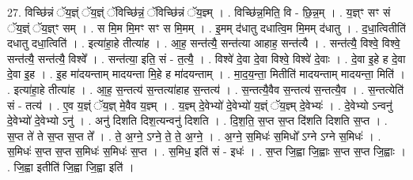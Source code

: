 \documentclass[17pt]{extarticle}
\begin{document}
27. विच्छि॑न्नं ॅय॒ज्ञ्ं ॅय॒ज्ञ्ं ॅविच्छि॑न्नं॒ ॅविच्छि॑न्नं ॅय॒ज्ञ्म् । . विच्छि॑न्न॒मिति॒ वि - छि॒न्न॒म् । . य॒ज्ञ्ꣳ सꣳ सं ॅय॒ज्ञ्ं ॅय॒ज्ञ्ꣳ सम् । . स मि॒म मि॒मꣳ सꣳ स मि॒मम् । . इ॒मम् द॑धातु दधात्वि॒म मि॒मम् द॑धातु । . द॒धा॒त्वितीति॑ दधातु दधा॒त्विति॑ । . इत्या॑हा॒हे तीत्या॑ह । . आ॒ह॒ सन्त॑त्यै॒ सन्त॑त्या आहाह॒ सन्त॑त्यै । . सन्त॑त्यै॒ विश्वे॒ विश्वे॒ सन्त॑त्यै॒ सन्त॑त्यै॒ विश्वे᳚ । . सन्त॑त्या॒ इति॒ सं - त॒त्यै॒ । . विश्वे॑ दे॒वा दे॒वा विश्वे॒ विश्वे॑ दे॒वाः । . दे॒वा इ॒हे ह दे॒वा दे॒वा इ॒ह । . इ॒ह मा॑दयन्ताम् मादयन्ता मि॒हे ह मा॑दयन्ताम् । . मा॒द॒य॒न्ता॒ मितीति॑ मादयन्ताम् मादयन्ता॒ मिति॑ । . इत्या॑हा॒हे तीत्या॑ह । . आ॒ह॒ स॒न्तत्य॑ स॒न्तत्या॑हाह स॒न्तत्य॑ । . स॒न्तत्यै॒वैव स॒न्तत्य॑ स॒न्तत्यै॒व । . स॒न्तत्येति॑ सं - तत्य॑ । . ए॒व य॒ज्ञ्ं ॅय॒ज्ञ् मे॒वैव य॒ज्ञ्म् । . य॒ज्ञ्म् दे॒वेभ्यो॑ दे॒वेभ्यो॑ य॒ज्ञ्ं ॅय॒ज्ञ्म् दे॒वेभ्यः॑ । . दे॒वेभ्यो ऽन्वनु॑ दे॒वेभ्यो॑ दे॒वेभ्यो ऽनु॑ । . अनु॑ दिशति दिश॒त्यन्वनु॑ दिशति । . दि॒श॒ति॒ स॒प्त स॒प्त दि॑शति दिशति स॒प्त । . स॒प्त ते॑ ते स॒प्त स॒प्त ते᳚ । . ते॒ अ॒ग्ने॒ ऽग्ने॒ ते॒ ते॒ अ॒ग्ने॒ । . अ॒ग्ने॒ स॒मिधः॑ स॒मिधो᳚ ऽग्ने ऽग्ने स॒मिधः॑ । . स॒मिधः॑ स॒प्त स॒प्त स॒मिधः॑ स॒मिधः॑ स॒प्त । . स॒मिध॒ इति॑ सं - इधः॑ । . स॒प्त जि॒ह्वा जि॒ह्वाः स॒प्त स॒प्त जि॒ह्वाः । . जि॒ह्वा इतीति॑ जि॒ह्वा जि॒ह्वा इति॑ । \newline
\end{document}
